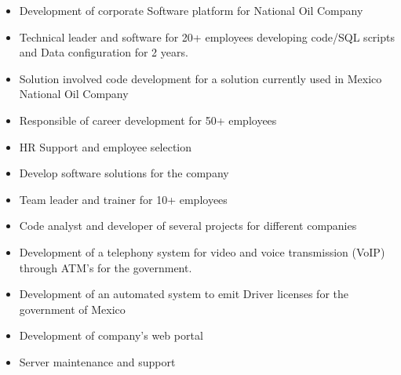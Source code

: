 \divider

\begin{itemize}
    \item Development of corporate Software platform for National Oil Company
    \item Technical leader and software for 20+ employees developing code/SQL scripts and Data configuration for 2 years.
    \item Solution involved code development for a solution currently used in Mexico National Oil Company
    
\end{itemize}
\divider


\begin{itemize}
\item Responsible of career development for 50+ employees
\item HR Support and employee selection
\end{itemize}


\begin{itemize}
\item Develop software solutions for the company
\item Team leader and trainer for 10+ employees
\end{itemize}

\begin{itemize}
\item Code analyst and developer of several projects for different companies
\end{itemize}

\begin{itemize}
\item Development of a telephony system for video and voice transmission
(VoIP) through ATM's for the government.
\item Development of an automated system to emit Driver licenses for the government of Mexico
\item Development of company's web portal
\item Server maintenance and support
\end{itemize}